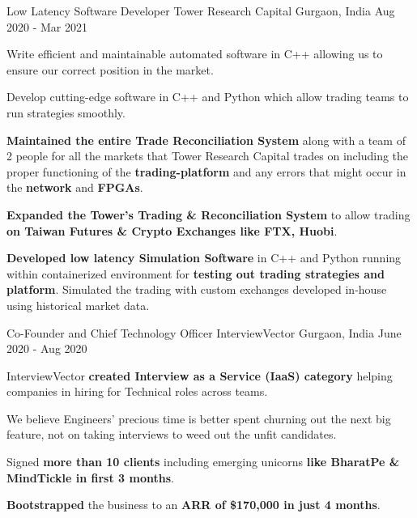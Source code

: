\begin{cventries}

  \cventry
    {Low Latency Software Developer} %
    {Tower Research Capital} %
    {Gurgaon, India} %
    {Aug 2020 - Mar 2021} %
    {
      \begin{cvitems} %
        \item {Write efficient and maintainable automated software in C++ allowing us to ensure our correct position in the market.}
        \item {Develop cutting-edge software in C++ and Python which allow trading teams to run strategies smoothly.}
        \item {\textbf{Maintained the entire Trade Reconciliation System} along with a team of 2 people for all the markets that Tower Research Capital trades on including the proper functioning of the \textbf{trading-platform} and any errors that might occur in the \textbf{network} and \textbf{FPGAs}.}
        \item {\textbf{Expanded the Tower's Trading \& Reconciliation System} to allow trading \textbf{on Taiwan Futures \& Crypto Exchanges like FTX, Huobi}.}
        \item {\textbf{Developed low latency Simulation Software} in C++ and Python running within containerized environment for \textbf{testing out trading strategies and platform}. Simulated the trading with custom exchanges developed in-house using historical market data.}
      \end{cvitems}
    }


  \cventry
    {Co-Founder and Chief Technology Officer} %
    {InterviewVector} %
    {Gurgaon, India} %
    {June 2020 - Aug 2020} %
    {
      \begin{cvitems} %
        \item {InterviewVector \textbf{created Interview as a Service (IaaS) category} helping companies in hiring for Technical roles across teams.}
        \item {We believe Engineers' precious time is better spent churning out the next big feature, not on taking interviews to weed out the unfit candidates.}
        \item {Signed \textbf{more than 10 clients} including emerging unicorns \textbf{like BharatPe \& MindTickle in first 3 months}.}
        \item {\textbf{Bootstrapped} the business to an \textbf{ARR of \$170,000 in just 4 months}.}
      \end{cvitems}
    }


\end{cventries}
